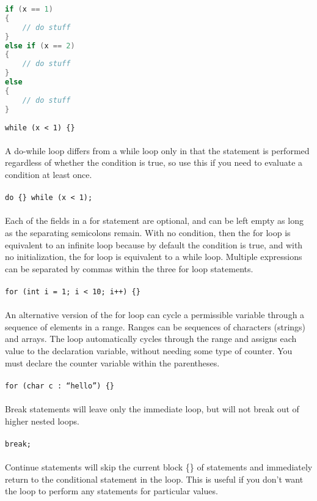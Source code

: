 \documentclass[10pt]{article}
\begin{document}
\begin{lstlisting}[language=C++]
if (x == 1)
{
	// do stuff
}
else if (x == 2)
{
	// do stuff
}
else
{
	// do stuff
}
\end{lstlisting}

\color{red}\texttt{while (x < 1) \{\} }\color{black}\\
\\
A do-while loop differs from a while loop only in that the statement is performed regardless of whether the condition is true, so use this if you need to evaluate a condition at least once.\\
\\
\color{red}\texttt{do \{\} while (x < 1);}\color{black}\\
\\
Each of the fields in a for statement are optional, and can be left empty as long as the separating semicolons remain. With no condition, then the for loop is equivalent to an infinite loop because by default the condition is true, and with no initialization, the for loop is equivalent to a while loop. Multiple expressions can be separated by commas within the three for loop statements.\\
\\
\color{red}\texttt{for (int i = 1; i < 10; i++) \{\} }\color{black}\\
\\
An alternative version of the for loop can cycle a permissible variable through a sequence of elements in a range. Ranges can be sequences of characters (strings) and arrays. The loop automatically cycles through the range and assigns each value to the declaration variable, without needing some type of counter. You must declare the counter variable within the parentheses.\\
\\
\color{red}\texttt{for (char c : ``hello'') \{\} }\color{black}\\
\\
Break statements will leave only the immediate loop, but will not break out of higher nested loops.\\
\\
\color{red}\texttt{break;}\color{black}\\
\\
Continue statements will skip the current block \{\} of statements and immediately return to the conditional statement in the loop. This is useful if you don't want the loop to perform any statements for particular values.\\
\end{document}
